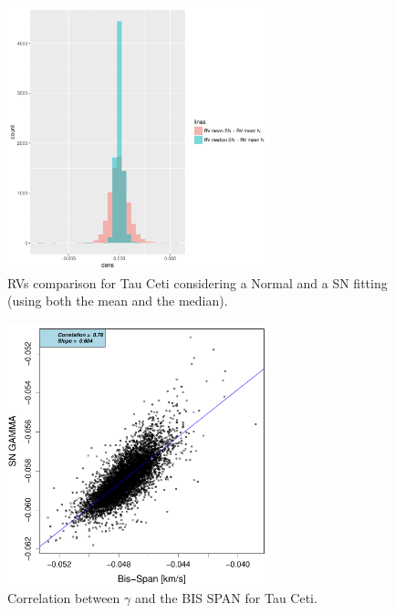 \documentclass[11pt, oneside]{article}
\begin{document}
%
\begin{figure}[htbp]
   \centering
\includegraphics[height = 3in]{[0]TauCeti_HistogramsDiff.pdf} 
   \caption{RVs comparison for Tau Ceti considering a Normal and a SN fitting (using both the mean and the median).}
   \label{fig:Tau Ceti:RV}
\end{figure}
%
\begin{figure}[htbp]
   \centering
\includegraphics[height = 3in]{HD10700_[2]gamma_vs_bisspan.pdf} 
   \caption{Correlation between $\gamma$ and the BIS SPAN for Tau Ceti.}
   \label{fig:Tau:corr.gamma}
\end{figure}
%
\end{document}
